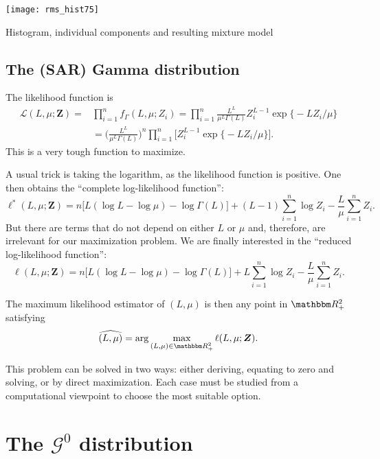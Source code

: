 \begin{marginfigure}
\centering
\texttt{[image: rms\_hist75]}
\caption{Histogram, individual components and resulting mixture model}
\label{fig:MixtureFit}
\end{marginfigure}


\subsection{The (SAR) Gamma distribution}

The likelihood function is 
\begin{align}
\mathcal L(L,\mu;\bm Z) =& \prod_{i=1}^{n}f_\Gamma(L,\mu; Z_i) = \prod_{i=1}^{n}\frac{L^L}{\mu^{L}\Gamma(L)} Z_i^{L-1} 
	\exp\big\{ -L Z_i / \mu
	\big\} \nonumber\\
	& = 
	\bigg(
	\frac{L^L}{\mu^{L}\Gamma(L)}
	\bigg)^n \prod_{i=1}^{n} \Big[Z_i^{L-1} \exp\big\{ -L Z_i / \mu
		\big\} \Big].
\end{align}
This is a very tough function to maximize.

A usual trick is taking the logarithm, as the likelihood function is positive.
One then obtains the ``complete log-likelihood function'':
\begin{equation}
\ell^*(L,\mu;\bm Z)=n\big[L(\log L - \log\mu) - \log\Gamma(L)
\big] + (L-1)\sum_{i=1}^n \log Z_i - \frac{L}{\mu} \sum_{i=1}^n Z_i.
\end{equation}
But there are terms that do not depend on either $L$ or $\mu$ and, therefore, are irrelevant for our maximization problem.
We are finally interested in the ``reduced log-likelihood function'':
\begin{equation}
\ell(L,\mu;\bm Z)=n\big[L(\log L - \log\mu) - \log\Gamma(L)
\big] + L\sum_{i=1}^n \log Z_i - \frac{L}{\mu} \sum_{i=1}^n Z_i.
\label{eq:RedLogLikGammaSAR}
\end{equation}

The maximum likelihood estimator of $(L,\mu)$ is then any point in $\mathbbm R_+^2$ satisfying
\begin{equation}
\widehat{(L,\mu)} = \arg\max_{(L,\mu)\in\mathbbm R_+^2} \ell(L,\mu;\bm Z).
\end{equation}

This problem can be solved in two ways: either deriving, equating to zero and solving, or by direct maximization.
Each case must be studied from a computational viewpoint to choose the most suitable option.

\section{The $\mathcal G^0$ distribution}

